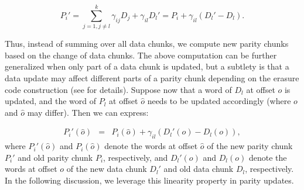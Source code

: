 \begin{equation*}
P_i' = \sum_{j=1,j\ne l}^{k} \gamma_{ij} D_j + \gamma_{il} D_l' 
= P_i + \gamma_{il}(D_l' - D_l). 
\end{equation*}

Thus, instead of summing over all data chunks, we compute new parity chunks
based on the change of data chunks.  The above computation can be further 
generalized when only part of a data chunk is updated, but a subtlety is that 
a data update may affect different parts of a parity chunk depending on the
erasure code construction (see \cite{plank13} for details).  Suppose now that
a word of $D_l$ at offset $o$ is updated, and the word of $P_l$ at offset
$\hat{o}$ needs to be updated accordingly (where $o$ and $\hat{o}$ may
differ).  Then we can express:

\begin{eqnarray}
P_i'(\hat{o}) 
& = & P_i(\hat{o}) + \gamma_{il}(D_l'(o) - D_l(o)),\nonumber
\end{eqnarray}
where $P_i'(\hat{o})$ and $P_i(\hat{o})$ denote the words at offset $\hat{o}$
of the new parity chunk $P_i'$ and old parity chunk $P_i$, respectively, and 
$D_l'(o)$ and $D_l(o)$ denote the words at offset $o$ of the new data chunk
$D_l'$ and old data chunk $D_l$, respectively.  In the following discussion,
we leverage this linearity property in parity updates. 

